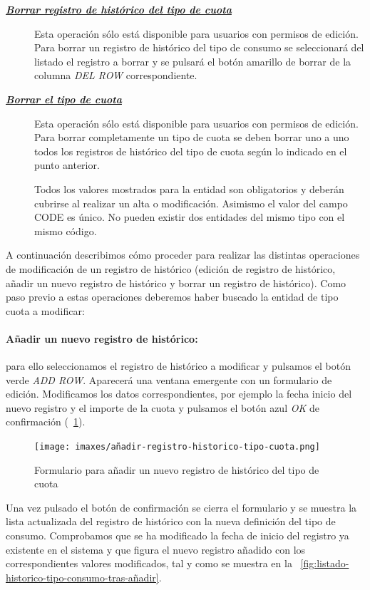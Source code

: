 \begin{description}
\item[\underline{\textsl{\textbf{Borrar registro de histórico del tipo de cuota}}}] Esta operación sólo está disponible para usuarios con permisos de edición.
Para borrar un registro de histórico del tipo de consumo se seleccionará del listado el registro a borrar y se pulsará el botón amarillo de borrar de la columna \textit{DEL ROW} correspondiente.

\item[\underline{\textsl{\textbf{Borrar el tipo de cuota}}}] Esta operación sólo está disponible para usuarios con permisos de edición.
Para borrar completamente un tipo de cuota se deben borrar uno a uno todos los registros de histórico del tipo de cuota según lo indicado en el punto anterior. 

Todos los valores mostrados para la entidad son obligatorios y deberán cubrirse al realizar un alta o modificación. Asimismo el valor del campo CODE es único. No pueden existir dos entidades del mismo tipo con el mismo código.
\end{description}

A continuación describimos cómo proceder para realizar las distintas operaciones de modificación de un registro de histórico (edición de registro de histórico, añadir un nuevo registro de histórico y borrar un registro de histórico). Como paso previo a estas operaciones deberemos haber buscado la entidad de tipo cuota a modificar:


\paragraph{Añadir un nuevo registro de histórico:} para ello seleccionamos el registro de histórico a modificar y pulsamos el botón verde \emph{ADD ROW}. Aparecerá una ventana emergente con un formulario de edición. Modificamos los datos correspondientes, por ejemplo la fecha inicio del nuevo registro y el importe de la cuota y pulsamos el botón azul \emph{OK} de confirmación (\figurename~\ref{fig:añadir-registro-historico-tipo-cuota}).

\begin{figure}
  \centering
  \texttt{[image: imaxes/añadir-registro-historico-tipo-cuota.png]}
  \caption{Formulario para añadir un nuevo registro de histórico del tipo de cuota}
  \label{fig:añadir-registro-historico-tipo-cuota}
\end{figure}


Una vez pulsado el botón de confirmación se cierra el formulario y se muestra la lista actualizada del registro de histórico con la nueva definición del tipo de consumo. Comprobamos que se ha modificado la fecha de inicio del registro ya existente en el sistema y que figura el nuevo registro añadido con los correspondientes valores modificados, tal y como se muestra en la \figurename~\ref{fig:listado-historico-tipo-consumo-tras-añadir}.

